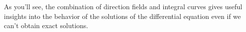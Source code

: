 \documentclass{ximera}
\begin{document}


As you'll  see, the combination of  direction fields and
 integral curves gives  useful insights into the behavior of
the solutions of the differential equation even if
we can't obtain exact solutions.
\end{document}
